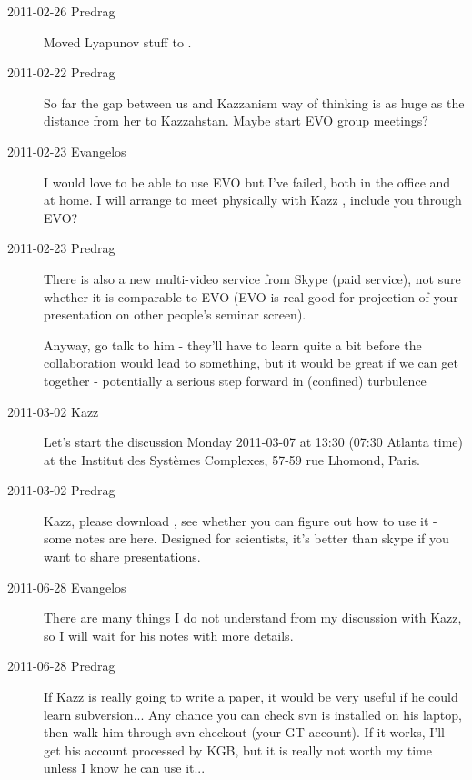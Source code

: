 \begin{description}

\item[2011-02-26 Predrag] Moved Lyapunov stuff to
    .


\item[2011-02-22 Predrag]
So far the gap between us and Kazzanism way of thinking is as huge
as the distance from her to Kazzahstan.
Maybe start EVO group meetings?

\item[2011-02-23 Evangelos]
I would love to be able to use EVO but I've
    failed, both in the office and at home. I will arrange to meet
    physically with Kazz \etal, include you
    through EVO?

\item[2011-02-23 Predrag]
There is also a new multi-video service from Skype (paid service), not
sure whether it is comparable to EVO (EVO is real good for projection of
your presentation on other people's seminar screen).

Anyway, go talk to him - they'll have to learn quite a bit before the
collaboration would lead to something, but it would be great if we can
get together - potentially a serious step forward in (confined)
turbulence

\item[2011-03-02 Kazz] Let's start the discussion
 Monday 2011-03-07 at 13:30 (07:30 Atlanta time) at the Institut des
 Syst\`emes Complexes, 57-59 rue Lhomond, Paris.

\item[2011-03-02 Predrag] Kazz, please download
, see whether you can
figure out how to use it - some notes are
{here}. Designed for scientists, it's better than skype if you want to
share presentations.

\item[2011-06-28 Evangelos]
There are many things I do not understand from my discussion with Kazz,
so I will wait for his notes with more details.

\item[2011-06-28 Predrag] If Kazz is really going to write a paper, it
would be very useful if he could learn subversion... Any chance you can
check svn is installed on his laptop, then walk him through svn checkout
(your GT account). If it works, I'll get his account processed by KGB,
but it is really not worth my time unless I know he can use it...


\end{description}
